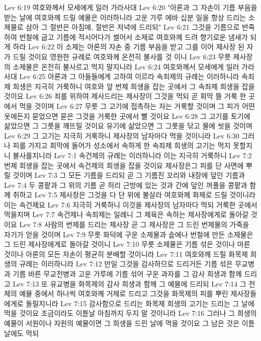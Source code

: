 Lev 6:19  여호와께서 모세에게 일러 가라사대
Lev 6:20  "아론과 그 자손이 기름 부음을 받는 날에 여호와께 드릴 예물은 이러하니라 고운 가루 에바 십분 일을 항상 드리는 소제물로 삼아 그 절반은 아침에, 절반은 저녁에 드리되"
Lev 6:21  그것을 기름으로 반죽하여 번철에 굽고 기름에 적시어다가 썰어서 소제로 여호와께 드려 향기로운 냄새가 되게 하라
Lev 6:22  이 소제는 아론의 자손 중 기름 부음을 받고 그를 이어 제사장 된 자가 드릴 것이요 영원한 규례로 여호와께 온전히 불사를 것 이니
Lev 6:23  무릇 제사장의 소제물은 온전히 불사르고 먹지 말지니라
Lev 6:24  여호와께서 모세에게 일러 가라사대
Lev 6:25  아론과 그 아들들에게 고하여 이르라 속죄제의 규례는 이러하니라 속죄제 희생은 지극히 거룩하니 여호와 앞 번제 희생을 잡는 곳에서 그 속죄제 희생을 잡을 것이요
Lev 6:26  죄를 위하여 제사드리는 제사장이 그것을 먹되 곧 회막 뜰 거룩 한 곳에서 먹을 것이며
Lev 6:27  무릇 그 고기에 접촉하는 자는 거룩할 것이며 그 피가 어떤 옷에든지 묻었으면 묻은 그것을 거룩한 곳에서 빨 것이요
Lev 6:28  그 고기를 토기에 삶았으면 그 그릇을 깨뜨릴 것이요 유기에 삶았으면 그 그릇을 닦고 물에 씻을 것이며
Lev 6:29  그 고기는 지극히 거룩하니 제사장의 남자마다 먹을 것이니라
Lev 6:30  그러나 피를 가지고 회막에 들어가 성소에서 속하게 한 속죄제 희생의 고기는 먹지 못할지니 불사를지니라
Lev 7:1  속건제의 규례는 이러하니라 이는 지극히 거룩하니
Lev 7:2  번제 희생을 잡는 곳에서 속건제의 희생을 잡을 것이요 제사장은그 피를 단 사면에 뿌릴 것이며
Lev 7:3  그 모든 기름을 드리되 곧 그 기름진 꼬리와 내장에 덮인 기름과
Lev 7:4  두 콩팥과 그 위의 기름 곧 허리 근방에 있는 것과 간에 덮인 꺼풀을 콩팥과 함께 취하고
Lev 7:5  제사장은 그것을 다 단 위에 불살라 여호와께 화제로 드릴 것이니라 이는 속건제요
Lev 7:6  지극히 거룩하니 이것을 제사장의 남자마다 먹되 거룩한 곳에서 먹을지며
Lev 7:7  속건제나 속죄제는 일례니 그 제육은 속하는 제사장에게로 돌아갈 것이요
Lev 7:8  사람의 번제를 드리는 제사장 곧 그 제사장은 그 드린 번제물의 가죽을 자기가 얻을 것이며
Lev 7:9  무릇 화덕에 구운 소제물과 솥에나 번철에 만든 소제물은 그 드린 제사장에게로 돌아갈 것이니
Lev 7:10  무릇 소제물은 기름 섞은 것이나 마른 것이나 아론의 모든 자손이 평균히 분배할 것이니라
Lev 7:11  여호와께 드릴 화목제 희생의 규례는 이러하니라
Lev 7:12  만일 그것을 감사하므로 드리거든 기름 섞은 무교병과 기름 바른 무교전병과 고운 가루에 기름 섞어 구운 과자를 그 감사 희생과 함께 드리고
Lev 7:13  또 유교병을 화목제의 감사 희생과 함께 그 예물에 드리되
Lev 7:14  그 전체의 예물 중에서 하나씩 여호와께 거제로 드리고 그것을 화목제의 피를 뿌린 제사장들에게로 돌릴지니라
Lev 7:15  감사함으로 드리는 화목제 희생의 고기는 드리는 그 날에 먹을 것이요 조금이라도 이튿날 아침까지 두지 말 것이니라
Lev 7:16  그러나 그 희생의 예물이 서원이나 자원의 예물이면 그 희생을 드린 날에 먹을 것이요 그 남은 것은 이튿날에도 먹되
